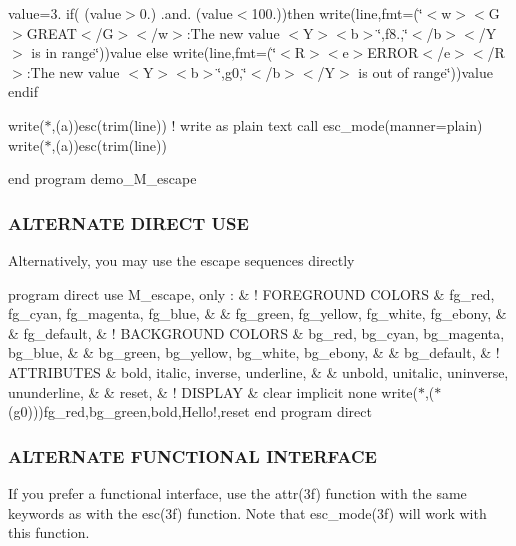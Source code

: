 value=3. if( (value$>$0.) .and. (value$<$100.))then write(line,fmt=\textquotesingle{}(\char`\"{}$<$w$>$$<$\+G$>$\+G\+R\+E\+A\+T$<$/\+G$>$$<$/w$>$\+:\+The new value $<$\+Y$>$$<$b$>$\char`\"{},f8.,\char`\"{}$<$/b$>$$<$/\+Y$>$ is in range\char`\"{})\textquotesingle{})value else write(line,fmt=\textquotesingle{}(\char`\"{}$<$\+R$>$$<$e$>$\+E\+R\+R\+O\+R$<$/e$>$$<$/\+R$>$\+:\+The new value $<$\+Y$>$$<$b$>$\char`\"{},g0,\char`\"{}$<$/b$>$$<$/\+Y$>$ is out of range\char`\"{})\textquotesingle{})value endif

write($\ast$,\textquotesingle{}(a)\textquotesingle{})esc(trim(line)) ! write as plain text call esc\+\_\+mode(manner=\textquotesingle{}plain\textquotesingle{}) write($\ast$,\textquotesingle{}(a)\textquotesingle{})esc(trim(line))

end program demo\+\_\+\+M\+\_\+escape

\subsubsection*{A\+L\+T\+E\+R\+N\+A\+TE D\+I\+R\+E\+CT U\+SE}

Alternatively, you may use the escape sequences directly

program direct use M\+\_\+escape, only \+: \& ! F\+O\+R\+E\+G\+R\+O\+U\+ND C\+O\+L\+O\+RS \& fg\+\_\+red, fg\+\_\+cyan, fg\+\_\+magenta, fg\+\_\+blue, \& \& fg\+\_\+green, fg\+\_\+yellow, fg\+\_\+white, fg\+\_\+ebony, \& \& fg\+\_\+default, \& ! B\+A\+C\+K\+G\+R\+O\+U\+ND C\+O\+L\+O\+RS \& bg\+\_\+red, bg\+\_\+cyan, bg\+\_\+magenta, bg\+\_\+blue, \& \& bg\+\_\+green, bg\+\_\+yellow, bg\+\_\+white, bg\+\_\+ebony, \& \& bg\+\_\+default, \& ! A\+T\+T\+R\+I\+B\+U\+T\+ES \& bold, italic, inverse, underline, \& \& unbold, unitalic, uninverse, ununderline, \& \& reset, \& ! D\+I\+S\+P\+L\+AY \& clear implicit none write($\ast$,\textquotesingle{}($\ast$(g0))\textquotesingle{})fg\+\_\+red,bg\+\_\+green,bold,\textquotesingle{}Hello!\textquotesingle{},reset end program direct

\subsubsection*{A\+L\+T\+E\+R\+N\+A\+TE F\+U\+N\+C\+T\+I\+O\+N\+AL I\+N\+T\+E\+R\+F\+A\+CE}

If you prefer a functional interface, use the attr(3f) function with the same keywords as with the esc(3f) function. Note that esc\+\_\+mode(3f) will work with this function.

